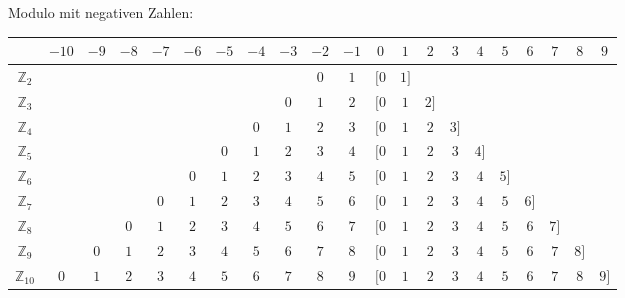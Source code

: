 Modulo mit negativen Zahlen:

\begin{table}[h]
\begin{tabular}{c|cccccccccccccccccccc}
& $-10$ & $-9$ & $-8$ & $-7$ & $-6$ & $-5$ & $-4$ & $-3$ & $-2$ & $-1$ & $0$ & $1$ & $2$ & $3$ & $4$ & $5$ & $6$ & $7$ & $8$ & $9$\\
\hline
$\mathbb{Z}_2$ & & & & & & & & & $0$ & $1$ & $[0$ & $1]$ & & & & & & & &\\
\hline
$\mathbb{Z}_3$ & & & & & & & & $0$ & $1$ & $2$ & $[0$ & $1$ & $2]$ & & & & & & &\\
\hline
$\mathbb{Z}_4$ & & & & & & & $0$ & $1$ & $2$ & $3$ & $[0$ & $1$ & $2$ & $3]$ & & & & & &\\
\hline
$\mathbb{Z}_5$ & & & & & & $0$ & $1$ & $2$ & $3$ & $4$ & $[0$ & $1$ & $2$ & $3$ & $4]$ & & & & &\\
\hline
$\mathbb{Z}_6$ & & & & & $0$ & $1$ & $2$ & $3$ & $4$ & $5$ & $[0$ & $1$ & $2$ & $3$ & $4$ & $5]$ & & & &\\
\hline
$\mathbb{Z}_7$ & & & & $0$ & $1$ & $2$ & $3$ & $4$ & $5$ & $6$ & $[0$ & $1$ & $2$ & $3$ & $4$ & $5$ & $6]$ & & &\\
\hline
$\mathbb{Z}_8$ & & & $0$ & $1$ & $2$ & $3$ & $4$ & $5$ & $6$ & $7$ & $[0$ & $1$ & $2$ & $3$ & $4$ & $5$ & $6$ & $7]$ & &\\
\hline
$\mathbb{Z}_9$ & & $0$ & $1$ & $2$ & $3$ & $4$ & $5$ & $6$ & $7$ & $8$ & $[0$ & $1$ & $2$ & $3$ & $4$ & $5$ & $6$ & $7$ & $8]$ &\\
\hline
$\mathbb{Z}_{10}$ & $0$ & $1$ & $2$ & $3$ & $4$ & $5$ & $6$ & $7$ & $8$ & $9$ & $[0$ & $1$ & $2$ & $3$ & $4$ & $5$ & $6$ & $7$ & $8$ & $9]$\\
\end{tabular}
\end{table}